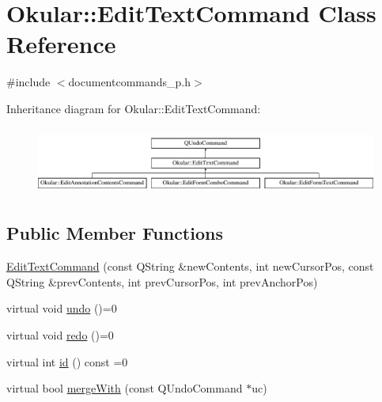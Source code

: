 \hypertarget{classOkular_1_1EditTextCommand}{\section{Okular\+:\+:Edit\+Text\+Command Class Reference}
\label{classOkular_1_1EditTextCommand}
}


{\ttfamily \#include $<$documentcommands\+\_\+p.\+h$>$}

Inheritance diagram for Okular\+:\+:Edit\+Text\+Command\+:\begin{figure}[H]
\begin{center}
\leavevmode
\includegraphics[height=2.248996cm]{classOkular_1_1EditTextCommand}
\end{center}
\end{figure}
\subsection*{Public Member Functions}
\begin{DoxyCompactItemize}
\item 
\hyperlink{classOkular_1_1EditTextCommand_ab8f13f426818beb420a58935ff679ff0}{Edit\+Text\+Command} (const Q\+String \&new\+Contents, int new\+Cursor\+Pos, const Q\+String \&prev\+Contents, int prev\+Cursor\+Pos, int prev\+Anchor\+Pos)
\item 
virtual void \hyperlink{classOkular_1_1EditTextCommand_ad993e3b67ac31c65bad4b2f916cb924b}{undo} ()=0
\item 
virtual void \hyperlink{classOkular_1_1EditTextCommand_ae922cb0edf65d0c471f5edd92f7ae81f}{redo} ()=0
\item 
virtual int \hyperlink{classOkular_1_1EditTextCommand_a8c906827b6f40eb9f4430cea8ba21392}{id} () const =0
\item 
virtual bool \hyperlink{classOkular_1_1EditTextCommand_a4c2ef5bccef7b7fc0c6f3a455283c312}{merge\+With} (const Q\+Undo\+Command $\ast$uc)
\end{DoxyCompactItemize}
